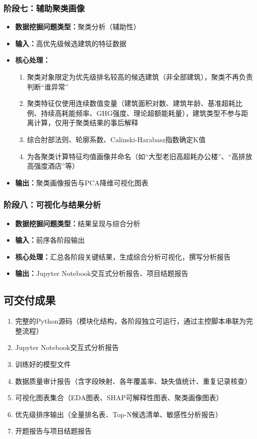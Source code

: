 \subsubsection{阶段七：辅助聚类画像}

\begin{itemize}
    \item \textbf{数据挖掘问题类型：}聚类分析（辅助性）
    \item \textbf{输入：}高优先级候选建筑的特征数据
    \item \textbf{核心处理：}
    \begin{enumerate}
        \item 聚类对象限定为优先级排名较高的候选建筑（非全部建筑），聚类不再负责判断``谁异常''
        \item 聚类特征仅使用连续数值变量（建筑面积对数、建筑年龄、基准超耗比例、持续高耗能频率、GHG强度、理论超额能耗量），建筑类型不参与距离计算，仅用于聚类结果的事后解释
        \item 综合肘部法则、轮廓系数、Calinski-Harabasz指数确定K值
        \item 为各聚类计算特征均值画像并命名（如``大型老旧高超耗办公楼''、``高排放高强度酒店''等）
    \end{enumerate}
    \item \textbf{输出：}聚类画像报告与PCA降维可视化图表
\end{itemize}

\subsubsection{阶段八：可视化与结果分析}

\begin{itemize}
    \item \textbf{数据挖掘问题类型：}结果呈现与综合分析
    \item \textbf{输入：}前序各阶段输出
    \item \textbf{核心处理：}汇总各阶段关键结果，生成综合分析可视化，撰写分析报告
    \item \textbf{输出：}Jupyter Notebook交互式分析报告、项目结题报告
\end{itemize}

\subsection{可交付成果}

\begin{enumerate}
    \item 完整的Python源码（模块化结构，各阶段独立可运行，通过主控脚本串联为完整流程）
    \item Jupyter Notebook交互式分析报告
    \item 训练好的模型文件
    \item 数据质量审计报告（含字段映射、各年覆盖率、缺失值统计、重复记录核查）
    \item 可视化图表集合（EDA图表、SHAP可解释性图表、聚类画像图表）
    \item 优先级排序输出（全量排名表、Top-N候选清单、敏感性分析报告）
    \item 开题报告与项目结题报告
\end{enumerate}

